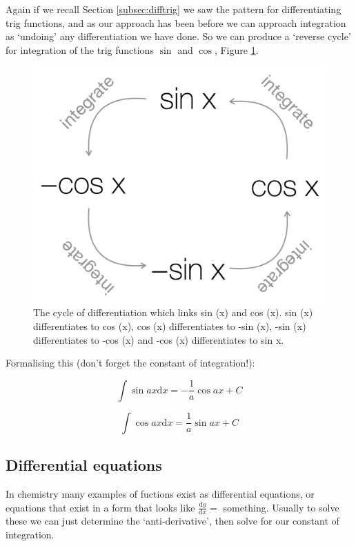 \documentclass[
]{book}
\begin{document}
Again if we recall Section \ref{subsec:difftrig} we saw the pattern for differentiating trig functions, and as our approach has been before we can approach integration as `undoing' any differentiation we have done. So we can produce a `reverse cycle' for integration of the trig functions \(\sin\) and \(\cos\), Figure \ref{fig:trigint}.

\begin{figure}

{\centering \includegraphics[width=0.6\linewidth]{images/trigint} 

}

\caption{The cycle of differentiation which links sin (x) and cos (x). sin (x) differentiates to cos (x), cos (x) differentiates to -sin (x), -sin (x) differentiates to -cos (x) and -cos (x) differentiates to sin x.}\label{fig:trigint}
\end{figure}

Formalising this (don't forget the constant of integration!):

\begin{equation}
\int \sin ax \textrm{d}x = -\frac{1}{a} \cos ax + C
\label{eq:intsin}
\end{equation}

\begin{equation}
\int \cos ax \textrm{d}x = \frac{1}{a} \sin ax + C
\label{eq:intsin}
\end{equation}

\hypertarget{subsec:diffequations}{%
\subsection{Differential equations}\label{subsec:diffequations}}

In chemistry many examples of fuctions exist as differential equations, or equations that exist in a form that looks like \(\tfrac{\textrm{d}y}{\textrm{d}x}=\) something. Usually to solve these we can just determine the `anti-derivative', then solve for our constant of integration.
\end{document}

